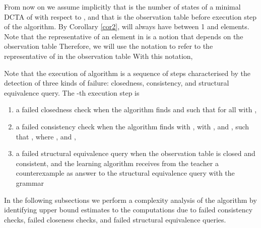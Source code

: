 \documentclass[preprint,12pt,english]{article}
\begin{document}
From now on we assume implicitly that  is the number of states of a minimal DCTA of  with respect to , and that  is the observation table  before execution step  of the algorithm. 
By Corollary \ref{cor2},  will always have between 1 and  elements. Note that the representative of an element  in  is a notion that depends on the observation table  Therefore, we will use the notation  to refer to the representative of  in the observation table  With this notation, 

Note that the execution of algorithm  is a sequence of steps characterised by the detection of three kinds of failure:  closedness,  consistency, and structural equivalence query. The -th execution step is
\begin{enumerate}
\item a failed closedness check when the algorithm finds  and  such that  for all  with ,
\item a failed consistency check when the algorithm finds  with ,  with , and , such that   ,  where , and ,
\item a failed structural equivalence query when the observation table  is closed and consistent, and the learning algorithm receives from the teacher a counterexample  as answer to the structural equivalence query with the grammar 
\end{enumerate}
In the following subsections we perform a complexity analysis of the algorithm by identifying upper bound estimates to the computations due to failed  consistency checks, failed closeness checks, and failed structural equivalence queries. 
\end{document}
